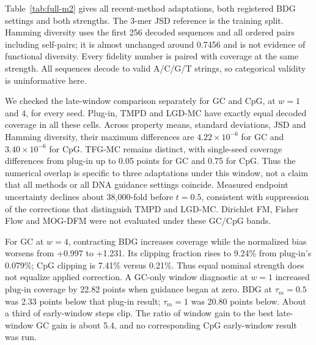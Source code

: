 \documentclass{article}
\begin{document}
Table~\ref{tab:full-m2} gives all recent-method adaptations, both registered BDG settings and both strengths. The 3-mer JSD reference is the training split. Hamming diversity uses the first 256 decoded sequences and all ordered pairs including self-pairs; it is almost unchanged around 0.7456 and is not evidence of functional diversity. Every fidelity number is paired with coverage at the same strength. All sequences decode to valid A/C/G/T strings, so categorical validity is uninformative here.

We checked the late-window comparison separately for GC and CpG, at $w=1$ and $4$, for every seed. Plug-in, TMPD and LGD-MC have exactly equal decoded coverage in all these cells. Across property means, standard deviations, JSD and Hamming diversity, their maximum differences are $4.22\times10^{-6}$ for GC and $3.40\times10^{-6}$ for CpG. TFG-MC remains distinct, with single-seed coverage differences from plug-in up to 0.05 points for GC and 0.75 for CpG. Thus the numerical overlap is specific to three adaptations under this window, not a claim that all methods or all DNA guidance settings coincide. Measured endpoint uncertainty declines about 38,000-fold before $t=0.5$, consistent with suppression of the corrections that distinguish TMPD and LGD-MC. Dirichlet FM, Fisher Flow and MOG-DFM were not evaluated under these GC/CpG bands.

For GC at $w=4$, contracting BDG increases coverage while the normalized bias worsens from +0.997 to +1.231. Its clipping fraction rises to 9.24\% from plug-in's 0.079\%; CpG clipping is 7.41\% versus 0.21\%. Thus equal nominal strength does not equalize applied correction. A GC-only window diagnostic at $w=1$ increased plug-in coverage by 22.82 points when guidance began at zero. BDG at $\tau_m=0.5$ was 2.33 points below that plug-in result; $\tau_m=1$ was 20.80 points below. About a third of early-window steps clip. The ratio of window gain to the best late-window GC gain is about 5.4, and no corresponding CpG early-window result was run.
\end{document}
